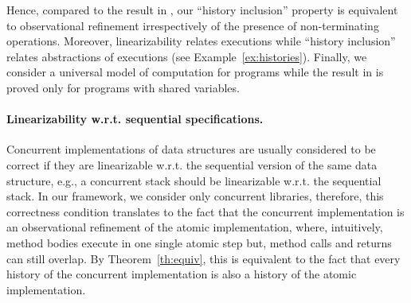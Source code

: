 %

Hence, compared to the result in \citet{journals/tcs/FilipovicORY10}, our ``history inclusion''
property is equivalent to observational refinement irrespectively of the presence of 
non-terminating operations. 
Moreover, linearizability relates executions while ``history inclusion'' relates abstractions
of executions (see Example~\ref{ex:histories}). Finally, we consider a universal model of
computation for programs while the result in \citet{journals/tcs/FilipovicORY10} is
proved only for programs with shared variables.

\paragraph{Linearizability w.r.t. sequential specifications.}
Concurrent implementations of data structures are usually considered to be
correct if they are linearizable w.r.t. the sequential version of the same data
structure, e.g., a concurrent stack should be linearizable w.r.t. the
sequential stack. In our framework, we consider only concurrent libraries,
therefore, this correctness condition translates to the fact that the
concurrent implementation is an observational refinement of the atomic
implementation, where, intuitively, method bodies execute in one single atomic
step but, method calls and returns can still overlap. By Theorem~\ref{th:equiv}, this is equivalent
to the fact that every history of the concurrent implementation is also a history of the
atomic implementation.

